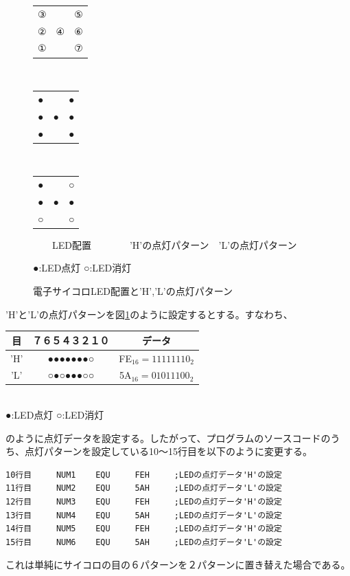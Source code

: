 \documentclass[a4paper,12pt]{ujarticle}
\begin{document}
    \begin{figure}[h]
      \begin{center}
       \begin{tabular}[t]{|ccc|}
        \hline
        \rule[0mm]{0mm}{7mm}③&   &⑤\\
        \rule[0mm]{0mm}{7mm}②& ④&⑥\\
        \rule[0mm]{0mm}{7mm}①&   &⑦\\ \hline
       \end{tabular}
       \begin{tabular}[t]{|ccc|}
        \hline
        \rule[0mm]{0mm}{7mm}●&   &●\\
        \rule[0mm]{0mm}{7mm}●& ●&●\\
        \rule[0mm]{0mm}{7mm}●&   &●\\ \hline
       \end{tabular}
       \begin{tabular}[t]{|ccc|}
        \hline
        \rule[0mm]{0mm}{7mm}●&   &○\\
        \rule[0mm]{0mm}{7mm}●& ●&●\\
        \rule[0mm]{0mm}{7mm}○
        &   &○\\ \hline
       \end{tabular}

   　　LED配置　　　　'H'の点灯パターン　'L'の点灯パターン

       ●:LED点灯 ○:LED消灯
      \end{center}
       \caption{電子サイコロLED配置と'H','L'の点灯パターン}
       \label{fig-HL}
    \end{figure}

    'H'と'L'の点灯パターンを図\ref{fig-HL}のように設定するとする。すなわち、
    \begin{center}
       \begin{tabular}{c|c|c}\hline
        目&７６５４３２１０ & データ \\ \hline
       'H'&●●●●●●●○ & FE$_{16}=11111110_2$ \\
       'L'&○●○●●●○○ & 5A$_{16}=01011100_2$\\ \hline
       \end{tabular}\\
      ●:LED点灯 ○:LED消灯
    \end{center}
      のように点灯データを設定する。したがって、プログラムのソースコードのうち、点灯パターンを設定している10〜15行目を以下のように変更する。
      \begin{lstlisting}[basicstyle=\ttfamily\footnotesize, frame=single]
10行目     NUM1    EQU     FEH     ;LEDの点灯データ'H'の設定
11行目     NUM2    EQU     5AH     ;LEDの点灯データ'L'の設定
12行目     NUM3    EQU     FEH     ;LEDの点灯データ'H'の設定
13行目     NUM4    EQU     5AH     ;LEDの点灯データ'L'の設定
14行目     NUM5    EQU     FEH     ;LEDの点灯データ'H'の設定
15行目     NUM6    EQU     5AH     ;LEDの点灯データ'L'の設定
      \end{lstlisting}
      これは単純にサイコロの目の６パターンを２パターンに置き替えた場合である。
\end{document}
